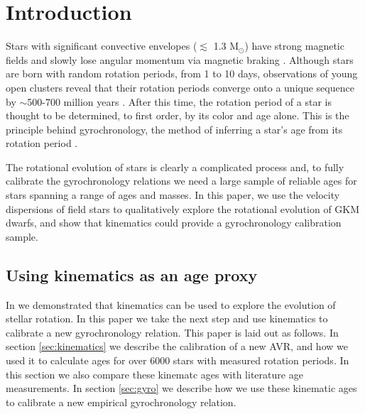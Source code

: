 \section{Introduction}

Stars with significant convective envelopes ($\lesssim$ 1.3 M$_\odot$) have
strong magnetic fields and slowly lose angular momentum via magnetic braking
\citep[\eg][]{schatzman1962, weber1967, skumanich1972, kawaler1988,
pinsonneault1989}.
Although stars are born with random rotation periods, from 1 to 10 days,
observations of young open clusters reveal that their rotation periods
converge onto a unique sequence by $\sim$500-700 million years
\citep[\eg][]{irwin2009, gallet2013}.
After this time, the rotation period of a star is thought to be determined, to
first order, by its color and age alone.
This is the principle behind gyrochronology, the method of inferring a
star’s age from its rotation period \citep[\eg][]{barnes2003, barnes2007,
barnes2010, meibom2011, meibom2015}.

The rotational evolution of stars is clearly a complicated process and, to
fully calibrate the gyrochronology relations we need a large sample of
reliable ages for stars spanning a range of ages and masses.
In this paper, we use the velocity dispersions of field stars to qualitatively
explore the rotational evolution of GKM dwarfs, and show that kinematics could
provide a gyrochronology calibration sample.

\subsection{Using kinematics as an age proxy}

In \citet{angus2020} we demonstrated that kinematics can be used to explore
the evolution of stellar rotation.
In this paper we take the next step and use kinematics to calibrate a new
gyrochronology relation.
This paper is laid out as follows.
In section \ref{sec:kinematics} we describe the calibration of a new AVR, and
how we used it to calculate ages for over 6000 stars with measured rotation
periods.
In this section we also compare these kinematc ages with literature age
measurements.
In section \ref{sec:gyro} we describe how we use these kinematic ages to
calibrate a new empirical gyrochronology relation.
